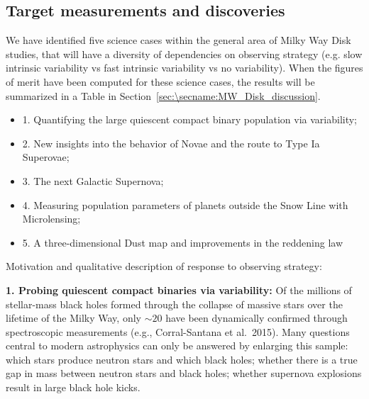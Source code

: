 
\subsection{Target measurements and discoveries}
\label{sec:\secname:MW_Disk_targets}



We have identified five science cases within the general area of Milky
Way Disk studies, that will have a diversity of dependencies on
observing strategy (e.g. slow intrinsic variability vs fast intrinsic
variability vs no variability). When the figures of merit have been
computed for these science cases, the results will be summarized in a Table in Section~\ref{sec:\secname:MW_Disk_discussion}.

\begin{itemize}
  \item 1. Quantifying the large quiescent compact binary population via variability;
  \item 2. New insights into the behavior of Novae and the route to Type Ia Superovae;
  \item 3. The next Galactic Supernova;
  \item 4. Measuring population parameters of planets outside the Snow Line with Microlensing;
  \item 5. A three-dimensional Dust map and improvements in the reddening law
\end{itemize}

Motivation and qualitative description of response to observing strategy:

{\bf 1. Probing quiescent compact binaries via variability:} Of the
millions of stellar-mass black holes formed through the collapse of
massive stars over the lifetime of the Milky Way, only $\sim 20$ have
been dynamically confirmed through spectroscopic measurements (e.g.,
Corral-Santana et al.~2015). Many questions central to modern
astrophysics can only be answered by enlarging this sample: which
stars produce neutron stars and which black holes; whether there is a
true gap in mass between neutron stars and black holes; whether
supernova explosions result in large black hole kicks. 

